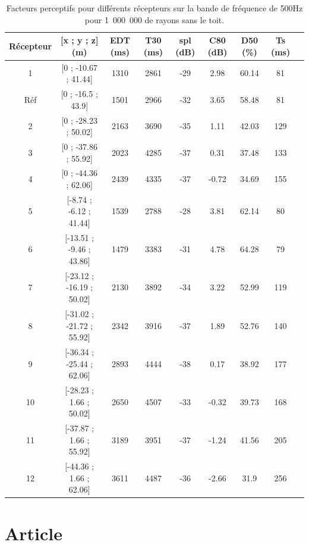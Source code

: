 \begin{table}[!h]
\footnotesize
 \begin{tabular}{| *{9}{c|}} 
 \hline 
 Récepteur & [x ; y ; z] (m)  & \gls{EDT} (ms) & \gls{T30} (ms) & \gls{spl} (dB) & \gls{C80} (dB) & \gls{D50} (\%) & \gls{Ts} (ms) \\ %
 \hline 
 \hline 
1  & [0 ; -10.67 ; 41.44] &1310  &2861   &-29  &2.98  &60.14  &81 \\%
 \hline 
 Réf    &[0 ; -16.5 ; 43.9] &1501  &2966   &-32  &3.65  &58.48  &81 \\%
 \hline 
 2  & [0 ; -28.23 ; 50.02] &2163  &3690   &-35  &1.11  &42.03  &129 \\ %
 \hline 
 3  &  [0 ; -37.86 ; 55.92] &2023  &4285   &-37  &0.31  &37.48  &133 \\ %
 \hline 
 4  &  [0 ; -44.36 ; 62.06] &2439  &4335   &-37  &-0.72  &34.69  &155 \\%
 \hline 
 \hline
 5  &   [-8.74 ; -6.12 ; 41.44] &1539  &2788   &-28  &3.81  &62.14  &80 \\%
 \hline 
 6  &  [-13.51 ; -9.46 ; 43.86] &1479  &3383   &-31  &4.78  &64.28  &79 \\%
  \hline 
  7 &   [-23.12 ; -16.19 ; 50.02] &2130  &3892   &-34  &3.22  &52.99  &119 \\ %
 \hline 
 8  &  [-31.02 ; -21.72 ; 55.92] &2342  &3916   &-37  &1.89  &52.76  &140 \\ %
 \hline 
 9  & [-36.34 ; -25.44 ; 62.06] &2893  &4444   &-38  &0.17  &38.92  &177 \\ %
 \hline 
 \hline
 10  &  [-28.23 ; 1.66 ; 50.02] &2650  &4507   &-33  &-0.32  &39.73  &168 \\ %
 \hline 
11   & [-37.87 ; 1.66 ; 55.92] &3189  & 3951  &-37  & -1.24 &41.56  &205 \\%
 \hline 
12   & [-44.36 ; 1.66 ; 62.06] &3611  & 4487  & -36 &-2.66  &31.9  & 256\\ %
 \hline 
\end{tabular} 
 \caption{Facteurs perceptifs pour différents récepteurs sur la bande de fréquence de 500Hz pour 1~000~000 de rayons sans le toit.} 
 \label{tab_fac_listener_sansToit} 
 \end{table}
 
\section*{Article \footnotemark}


 
 